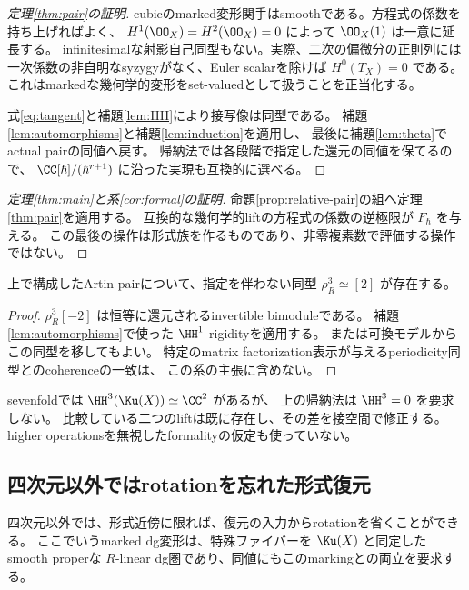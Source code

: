 \begin{proof}[定理\ref{thm:pair}の証明]
 cubicのmarked変形関手はsmoothである。方程式の係数を持ち上げればよく、
 \(H^1(\OO_X)=H^2(\OO_X)=0\) によって \(\OO_X(1)\) は一意に延長する。
 infinitesimalな射影自己同型もない。実際、二次の偏微分の正則列には
 一次係数の非自明なsyzygyがなく、Euler scalarを除けば \(H^0(T_X)=0\) である。
 これはmarkedな幾何学的変形をset-valuedとして扱うことを正当化する。

 式\eqref{eq:tangent}と補題\ref{lem:HH}により接写像は同型である。
 補題\ref{lem:automorphisms}と補題\ref{lem:induction}を適用し、
 最後に補題\ref{lem:theta}でactual pairの同値へ戻す。
 帰納法では各段階で指定した還元の同値を保てるので、
 \(\CC[\hbar]/(\hbar^{r+1})\) に沿った実現も互換的に選べる。
\end{proof}

\begin{proof}[定理\ref{thm:main}と系\ref{cor:formal}の証明]
 命題\ref{prop:relative-pair}の組へ定理\ref{thm:pair}を適用する。
 互換的な幾何学的liftの方程式の係数の逆極限が \(F_\hbar\) を与える。
 この最後の操作は形式族を作るものであり、非零複素数で評価する操作ではない。
\end{proof}

\begin{corollary}\label{cor:period}
 上で構成したArtin pairについて、指定を伴わない同型
 \(\rho_R^3\simeq[2]\) が存在する。
\end{corollary}
\begin{proof}
 \(\rho_R^3[-2]\) は恒等に還元されるinvertible bimoduleである。
 補題\ref{lem:automorphisms}で使った \(\HH^1\)-rigidityを適用する。
 または可換モデルからこの同型を移してもよい。
 特定のmatrix factorization表示が与えるperiodicity同型とのcoherenceの一致は、
 この系の主張に含めない。
\end{proof}

\begin{remark}
 sevenfoldでは \(\HH^3(\Ku(X))\simeq\CC^2\) があるが、
 上の帰納法は \(\HH^3=0\) を要求しない。
 比較している二つのliftは既に存在し、その差を接空間で修正する。
 higher operationsを無視したformalityの仮定も使っていない。
\end{remark}

\subsection{四次元以外ではrotationを忘れた形式復元}\label{sec:unpolarized-formal}

四次元以外では、形式近傍に限れば、復元の入力からrotationを省くことができる。
ここでいうmarked dg変形は、特殊ファイバーを \(\Ku(X)\) と同定した
smooth properな \(R\)-linear dg圏であり、同値にもこのmarkingとの両立を要求する。

